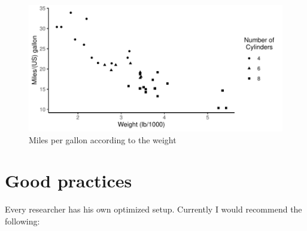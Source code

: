 \documentclass[
  12pt,
]{article}
\begin{document}
\begin{figure}[H]

{\centering \includegraphics{paper_files/figure-latex/fig-2-1} 

}

\caption{Miles per gallon according to the weight}\label{fig:fig-2}
\end{figure}

\hypertarget{good-practices}{%
\section{Good practices}\label{good-practices}}

Every researcher has his own optimized setup. Currently I would recommend the following:
\end{document}
